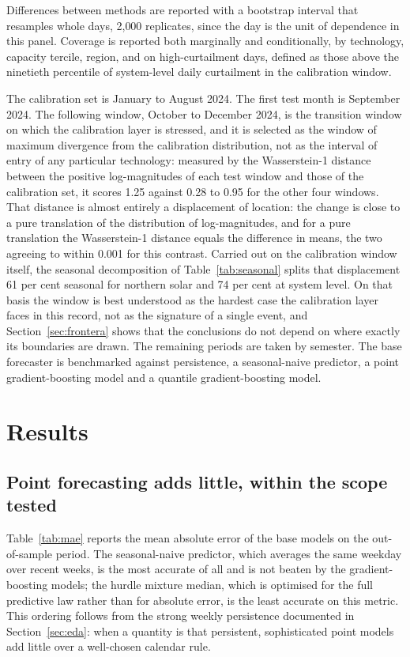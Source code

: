 \documentclass[preprint,3p,times]{elsarticle}
\begin{document}
Differences between methods are reported with a bootstrap interval that resamples whole days, 2{,}000 replicates, since the day is the unit of dependence in this panel. Coverage is reported both marginally and conditionally, by technology, capacity tercile, region, and on high-curtailment days, defined as those above the ninetieth percentile of system-level daily curtailment in the calibration window.

The calibration set is January to August 2024. The first test month is September 2024. The following window, October to December 2024, is the transition window on which the calibration layer is stressed, and it is selected as the window of maximum divergence from the calibration distribution, not as the interval of entry of any particular technology: measured by the Wasserstein-1 distance between the positive log-magnitudes of each test window and those of the calibration set, it scores 1.25 against 0.28 to 0.95 for the other four windows. That distance is almost entirely a displacement of location: the change is close to a pure translation of the distribution of log-magnitudes, and for a pure translation the Wasserstein-1 distance equals the difference in means, the two agreeing to within 0.001 for this contrast. Carried out on the calibration window itself, the seasonal decomposition of Table~\ref{tab:seasonal} splits that displacement 61 per cent seasonal for northern solar and 74 per cent at system level. On that basis the window is best understood as the hardest case the calibration layer faces in this record, not as the signature of a single event, and Section~\ref{sec:frontera} shows that the conclusions do not depend on where exactly its boundaries are drawn. The remaining periods are taken by semester. The base forecaster is benchmarked against persistence, a seasonal-naive predictor, a point gradient-boosting model and a quantile gradient-boosting model.

\section{Results}
\label{sec:results}

\subsection{Point forecasting adds little, within the scope tested}
\label{sec:punto}

Table~\ref{tab:mae} reports the mean absolute error of the base models on the out-of-sample period. The seasonal-naive predictor, which averages the same weekday over recent weeks, is the most accurate of all and is not beaten by the gradient-boosting models; the hurdle mixture median, which is optimised for the full predictive law rather than for absolute error, is the least accurate on this metric. This ordering follows from the strong weekly persistence documented in Section~\ref{sec:eda}: when a quantity is that persistent, sophisticated point models add little over a well-chosen calendar rule.
\end{document}
